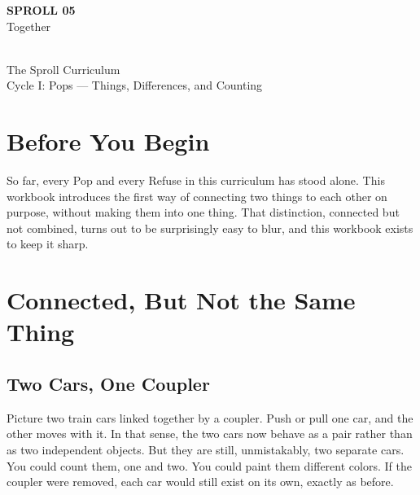 \documentclass[11pt]{book}
\begin{document}
\begin{titlepage}
\centering
\vspace*{1.4in}
{\Huge \textbf{SPROLL 05}}\\[0.5in]
{\huge Together}\\[0.8in]
\\[0.8in]
{\Large The Sproll Curriculum}\\[0.2in]
{\large Cycle I: Pops --- Things, Differences, and Counting}
\end{titlepage}

\tableofcontents

\chapter*{Before You Begin}

So far, every Pop and every Refuse in this curriculum has stood alone. This workbook introduces the first way of connecting two things to each other on purpose, without making them into one thing. That distinction, connected but not combined, turns out to be surprisingly easy to blur, and this workbook exists to keep it sharp.

\chapter{Connected, But Not the Same Thing}

\section{Two Cars, One Coupler}

Picture two train cars linked together by a coupler. Push or pull one car, and the other moves with it. In that sense, the two cars now behave as a pair rather than as two independent objects. But they are still, unmistakably, two separate cars. You could count them, one and two. You could paint them different colors. If the coupler were removed, each car would still exist on its own, exactly as before.

\begin{center}
\end{center}
\end{document}
